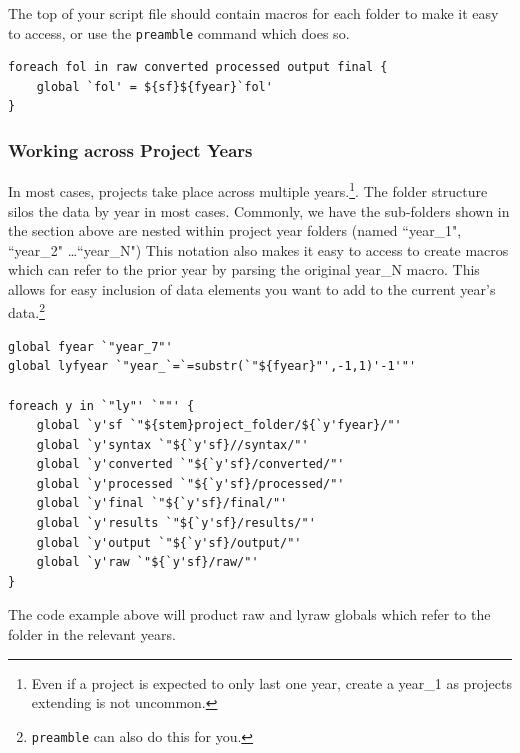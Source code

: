 The top of your script file should contain macros for each folder to make it easy to access, or use the \texttt{preamble} command which does so.
\begin{lstlisting}
foreach fol in raw converted processed output final {
	global `fol' = ${sf}${fyear}`fol'
}
\end{lstlisting}



\subsubsection{Working across Project Years} In most cases, projects take place across multiple years.\footnote{Even if a project is expected to only last one year, create a year\_1 as projects extending is not uncommon.}. The folder structure silos the data by year in most cases. Commonly, we have the sub-folders shown in the section above are nested within project year folders (named ``year\_1", ``year\_2" \ldots ``year\_N")  This notation also makes it easy to access to create macros which can refer to the prior year by parsing the original year\_N macro. This allows for easy inclusion of data elements you want to add to the current year\rq{}s data.\footnote{\texttt{preamble} can also do this for you.}

\begin{lstlisting}
global fyear `"year_7"'
global lyfyear `"year_`=`=substr(`"${fyear}"',-1,1)'-1'"'

foreach y in `"ly"' `""' {
	global `y'sf `"${stem}project_folder/${`y'fyear}/"'
	global `y'syntax `"${`y'sf}//syntax/"'
	global `y'converted `"${`y'sf}/converted/"'
	global `y'processed `"${`y'sf}/processed/"'
	global `y'final `"${`y'sf}/final/"'
	global `y'results `"${`y'sf}/results/"'
	global `y'output `"${`y'sf}/output/"'
	global `y'raw `"${`y'sf}/raw/"'
}
\end{lstlisting}

The code example above will product raw and lyraw globals which refer to the folder in the relevant years.

